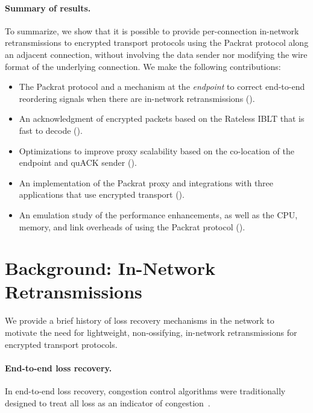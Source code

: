 \paragraph{Summary of results.}
To summarize, we show that it is possible to provide per-connection in-network
retransmissions to encrypted transport protocols using the Packrat protocol along
an adjacent connection, without involving the data sender nor modifying the
wire format of the underlying connection. We make the following contributions:

\begin{itemize}[noitemsep]
    \item The Packrat protocol and a mechanism at the \textit{endpoint} to correct
     end-to-end reordering signals when there are in-network retransmissions
     ().
    \item An acknowledgment of encrypted packets based on the Rateless IBLT
     that is fast to decode ().
    \item Optimizations to improve proxy
     scalability based on the co-location of the endpoint and quACK sender
     ().
    \item An implementation of the Packrat proxy and integrations with three
     applications that use encrypted transport ().
    \item An emulation study of the performance enhancements, as well as the CPU,
     memory, and link overheads of using the Packrat protocol ().
\end{itemize}

\section{Background: In-Network Retransmissions}

We provide a brief history of loss recovery mechanisms in the network to
motivate the need for lightweight, non-ossifying, in-network retransmissions
for encrypted transport protocols.

\paragraph{End-to-end loss recovery.}

In end-to-end loss recovery,
congestion control algorithms were traditionally designed to treat all loss as an indicator of
congestion~\cite{rfc5681tcp,rfc2001tcp}.

